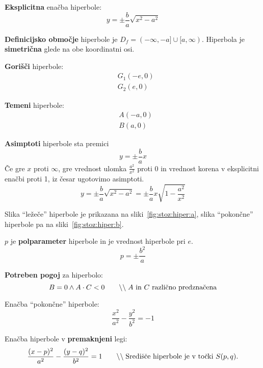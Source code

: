 \documentclass[a4paper,oneside,12pt,fleqn]{article}
\newcommand\krat\cdot
\newcommand{\comment}[1]{\ensuremath{\qquad\backslash\backslash\;}\textnormal{#1}}
\numberwithin{equation}{section}
\begin{document}
\textbf{Eksplicitna} enačba hiperbole:
\[ y = \pm \frac{b}{a} \sqrt{x^2 - a^2} \]

\textbf{Definicijsko območje} hiperbole je $D_f = (-\infty, -a] \cup [a, \infty)$.
Hiperbola je \textbf{simetrična} glede na obe koordinatni osi.

\textbf{Gorišči} hiperbole:
\begin{align*}
 &G_1(-e, 0) \\
 &G_2(e, 0)
\end{align*}

\textbf{Temeni} hiperbole:
\begin{align*}
  &A(-a, 0) \\
  &B(a, 0)
\end{align*}

\textbf{Asimptoti} hiperbole sta premici
\[ y = \pm \frac{b}{a}x \]
Če gre $x$ proti $\infty$, gre vrednost ulomka $\frac{a^2}{x^2}$ proti 0 in vrednost korena v eksplicitni enačbi proti 1, iz česar
ugotovimo asimptoti.
\[ y = \pm \frac{b}{a} \sqrt{x^2 - a^2}  = \pm \frac{b}{a} x \sqrt{1 -\frac{a^2}{x^2}} \]

Slika ``ležeče'' hiperbole je prikazana na sliki~\ref{fig:stoz:hiper:a}, slika
``pokončne'' hiperbole pa na sliki~\ref{fig:stoz:hiper:b}.

$p$ je \textbf{polparameter} hiperbole in je vrednost hiperbole pri $e$.
\[ p = \pm \frac{b^2}{a} \]

\textbf{Potreben pogoj} za hiperbolo:
\[ B = 0 \land A \krat C < 0 \comment{$A$ in $C$ različno predznačena} \]

Enačba ``pokončne'' hiperbole:
\[ \frac{x^2}{a^2} - \frac{y^2}{b^2} = -1 \]

Enačba hiperbole v \textbf{premaknjeni} legi:
\[ \frac{(x-p)^2}{a^2} - \frac{(y-q)^2}{b^2} = 1 \comment{Središče hiperbole je v točki
$S(p,q)$.} \]
\end{document}
